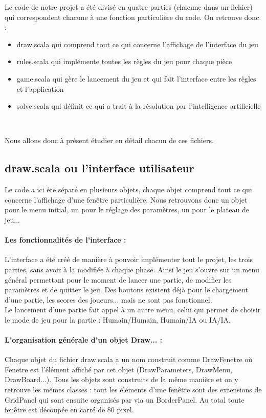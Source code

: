 \documentclass[a4paper]{article}
\begin{document}
Le code de notre projet a été divisé en quatre parties (chacune dans un fichier) qui correspondent chacune à une fonction particulière du code. On retrouve donc :
\begin{itemize}
\item draw.scala qui comprend tout ce qui concerne l'affichage de l'interface du jeu
\item rules.scala qui implémente toutes les règles du jeu pour chaque pièce
\item game.scala qui gère le lancement du jeu et qui fait l'interface entre les règles et l'application
\item solve.scala qui définit ce qui a trait à la résolution par l'intelligence artificielle
\end{itemize}~

Nous allons donc à présent étudier en détail chacun de ces fichiers.

\subsection{draw.scala ou l'interface utilisateur}

Le code a ici été séparé en plusieurs objets, chaque objet comprend tout ce qui concerne l'affichage d'une fenêtre particulière. Nous retrouvons donc un objet pour le menu initial, un pour le réglage des paramètres, un pour le plateau de jeu...

\paragraph{Les fonctionnalités de l'interface :}L'interface a été créé de manière à pouvoir implémenter tout le projet, les trois parties, sans avoir à la modifiée à chaque phase. Ainsi le jeu s'ouvre sur un menu général permettant pour le moment de lancer une partie, de modifier les paramètres et de quitter le jeu. Des boutons existent déjà pour le chargement d'une partie, les scores des joueurs... mais ne sont pas fonctionnel. \\

Le lancement d'une partie fait appel à un autre menu, celui qui permet de choisir le mode de jeu pour la partie : Humain/Humain, Humain/IA ou IA/IA.

\paragraph{L'organisation générale d'un objet Draw... :}Chaque objet du fichier draw.scala a un nom construit comme DrawFenetre où Fenetre est l'élément affiché par cet objet (DrawParameters, DrawMenu, DrawBoard...). Tous les objets sont construits de la même manière et on y retrouve les mêmes classes : tout les éléments d'une fenêtre sont des extensions de GridPanel qui sont ensuite organisés par via un BorderPanel. Au total toute fenêtre est découpée en carré de 80 pixel. \\
\end{document}
